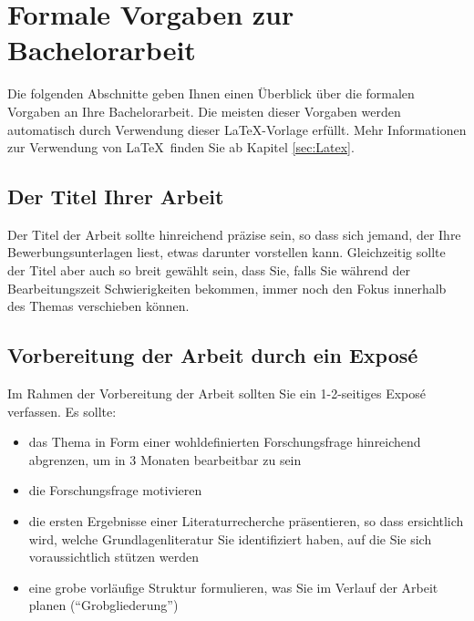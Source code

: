 \documentclass[a4paper,12pt]{scrartcl} %
\begin{document}
\begin{titlepage}
\end{titlepage}

\clearpage                %




\tableofcontents
\clearpage
\listoffigures
\clearpage
\listoftables
\clearpage
\printglossary[type=\acronymtype ,style=long,title=Abkürzungsverzeichnis]
\clearpage
\printglossary[type=symbolslist,style=long,title=Symbolverzeichnis]
\clearpage


\setcounter{page}{1}        %
\setcounter{table}{0}		%


\section{Formale Vorgaben zur Bachelorarbeit}

Die folgenden Abschnitte geben Ihnen einen Überblick über die formalen Vorgaben an Ihre Bachelorarbeit. Die meisten dieser Vorgaben werden automatisch durch Verwendung dieser \LaTeX-Vorlage erfüllt. Mehr Informationen zur Verwendung von \LaTeX\ finden Sie ab Kapitel \ref{sec:Latex}.

\subsection{Der Titel Ihrer Arbeit}

Der Titel der Arbeit sollte hinreichend präzise sein, so dass sich jemand, der Ihre Bewerbungsunterlagen liest, etwas darunter vorstellen kann. Gleichzeitig sollte der Titel aber auch so breit gewählt sein, dass Sie, falls Sie während der Bearbeitungszeit Schwierigkeiten bekommen, immer noch den Fokus innerhalb des Themas verschieben können.

\subsection{Vorbereitung der Arbeit durch ein Exposé}

Im Rahmen der Vorbereitung der Arbeit sollten Sie ein 1-2-seitiges Exposé verfassen. Es sollte:
\begin{itemize}
  \item das Thema in Form einer wohldefinierten Forschungsfrage hinreichend abgrenzen, um in 3 Monaten bearbeitbar zu sein
  \item die Forschungsfrage motivieren
  \item  die ersten Ergebnisse einer Literaturrecherche präsentieren, so dass ersichtlich wird, welche Grundlagenliteratur Sie identifiziert haben, auf die Sie sich voraussichtlich stützen werden
  \item eine grobe vorläufige Struktur formulieren, was Sie im Verlauf der Arbeit planen (``Grobgliederung'')
\end{itemize}
\end{document}
